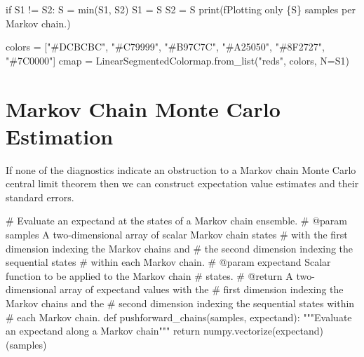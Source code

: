\documentclass[
  letterpaper,
  DIV=11,
  numbers=noendperiod]{scrartcl}
\newenvironment{Shaded}{\begin{snugshade}}{\end{snugshade}}
\newcommand{\BuiltInTok}[1]{\textcolor[rgb]{0.00,0.23,0.31}{#1}}
\newcommand{\CommentTok}[1]{\textcolor[rgb]{0.37,0.37,0.37}{#1}}
\newcommand{\ControlFlowTok}[1]{\textcolor[rgb]{0.00,0.23,0.31}{#1}}
\newcommand{\KeywordTok}[1]{\textcolor[rgb]{0.00,0.23,0.31}{#1}}
\newcommand{\NormalTok}[1]{\textcolor[rgb]{0.00,0.23,0.31}{#1}}
\newcommand{\OperatorTok}[1]{\textcolor[rgb]{0.37,0.37,0.37}{#1}}
\newcommand{\SpecialCharTok}[1]{\textcolor[rgb]{0.37,0.37,0.37}{#1}}
\newcommand{\SpecialStringTok}[1]{\textcolor[rgb]{0.13,0.47,0.30}{#1}}
\newcommand{\StringTok}[1]{\textcolor[rgb]{0.13,0.47,0.30}{#1}}
\begin{document}
\begin{Shaded}
\begin{Highlighting}[]
  \ControlFlowTok{if}\NormalTok{ S1 }\OperatorTok{!=}\NormalTok{ S2:}
\NormalTok{    S }\OperatorTok{=} \BuiltInTok{min}\NormalTok{(S1, S2)}
\NormalTok{    S1 }\OperatorTok{=}\NormalTok{ S}
\NormalTok{    S2 }\OperatorTok{=}\NormalTok{ S}
    \BuiltInTok{print}\NormalTok{(}\SpecialStringTok{f\textquotesingle{}Plotting only }\SpecialCharTok{\{}\NormalTok{S}\SpecialCharTok{\}}\SpecialStringTok{ samples per Markov chain.\textquotesingle{}}\NormalTok{)}
  
\NormalTok{  colors }\OperatorTok{=}\NormalTok{ [}\StringTok{"\#DCBCBC"}\NormalTok{, }\StringTok{"\#C79999"}\NormalTok{, }\StringTok{"\#B97C7C"}\NormalTok{,}
            \StringTok{"\#A25050"}\NormalTok{, }\StringTok{"\#8F2727"}\NormalTok{, }\StringTok{"\#7C0000"}\NormalTok{]}
\NormalTok{  cmap }\OperatorTok{=}\NormalTok{ LinearSegmentedColormap.from\_list(}\StringTok{"reds"}\NormalTok{, colors, N}\OperatorTok{=}\NormalTok{S1)}
\end{Highlighting}
\end{Shaded}

\section{Markov Chain Monte Carlo
Estimation}\label{markov-chain-monte-carlo-estimation}

If none of the diagnostics indicate an obstruction to a Markov chain
Monte Carlo central limit theorem then we can construct expectation
value estimates and their standard errors.

\begin{Shaded}
\begin{Highlighting}[]
\CommentTok{\# Evaluate an expectand at the states of a Markov chain ensemble.}
\CommentTok{\# @param samples A two{-}dimensional array of scalar Markov chain states}
\CommentTok{\#                with the first dimension indexing the Markov chains and}
\CommentTok{\#                the second dimension indexing the sequential states}
\CommentTok{\#                within each Markov chain.}
\CommentTok{\# @param expectand Scalar function to be applied to the Markov chain}
\CommentTok{\#                  states.}
\CommentTok{\# @return A two{-}dimensional array of expectand values with the}
\CommentTok{\#         first dimension indexing the Markov chains and the}
\CommentTok{\#         second dimension indexing the sequential states within}
\CommentTok{\#         each Markov chain.}
\KeywordTok{def}\NormalTok{ pushforward\_chains(samples, expectand):}
  \CommentTok{"""Evaluate an expectand along a Markov chain"""}
  \ControlFlowTok{return}\NormalTok{ numpy.vectorize(expectand)(samples)}
\end{Highlighting}
\end{Shaded}
\end{document}

